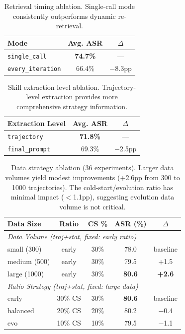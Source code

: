 \documentclass{article} %
\begin{document}
\begin{table}[h]
\centering
\caption{Retrieval timing ablation. Single-call mode consistently outperforms dynamic re-retrieval.}
\label{tab:retrieval_timing}
\small
\begin{tabular}{lcc}
\toprule
\textbf{Mode} & \textbf{Avg. ASR} & \textbf{$\Delta$} \\
\midrule
\texttt{single\_call} & \textbf{74.7\%} & --- \\
\texttt{every\_iteration} & 66.4\% & $-$8.3pp \\
\bottomrule
\end{tabular}
\end{table}

\begin{table}[h]
\centering
\caption{Skill extraction level ablation. Trajectory-level extraction provides more comprehensive strategy information.}
\label{tab:extraction_level}
\small
\begin{tabular}{lcc}
\toprule
\textbf{Extraction Level} & \textbf{Avg. ASR} & \textbf{$\Delta$} \\
\midrule
\texttt{trajectory} & \textbf{71.8\%} & --- \\
\texttt{final\_prompt} & 69.3\% & $-$2.5pp \\
\bottomrule
\end{tabular}
\end{table}

\begin{table}[h]
\centering
\caption{Data strategy ablation (36 experiments). Larger data volumes yield modest improvements (+2.6pp from 300 to 1000 trajectories). The cold-start/evolution ratio has minimal impact ($<$1.1pp), suggesting evolution data volume is not critical.}
\label{tab:layer2}
\footnotesize
\setlength{\tabcolsep}{2.5pt}
\begin{tabular}{lcccc}
\toprule
\textbf{Data Size} & \textbf{Ratio} & \textbf{CS \%} & \textbf{ASR (\%)} & \textbf{$\Delta$} \\
\midrule
\multicolumn{5}{l}{\textit{Data Volume (traj+stat, fixed: early ratio)}} \\
small (300) & early & 30\% & 78.0 & baseline \\
medium (500) & early & 30\% & 79.5 & +1.5 \\
large (1000) & early & 30\% & \textbf{80.6} & \textbf{+2.6} \\
\midrule
\multicolumn{5}{l}{\textit{Ratio Strategy (traj+stat, fixed: large data)}} \\
early & 30\% CS & 30\% & \textbf{80.6} & baseline \\
balanced & 20\% CS & 20\% & 80.2 & $-$0.4 \\
evo & 10\% CS & 10\% & 79.5 & $-$1.1 \\
\bottomrule
\end{tabular}
\end{table}
\end{document}

